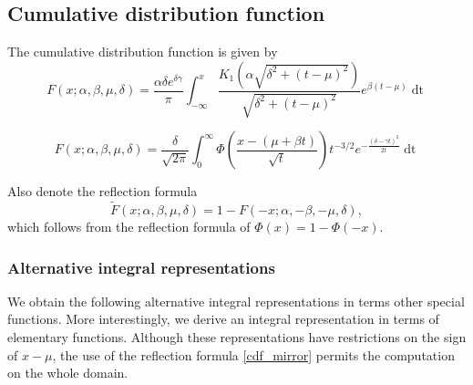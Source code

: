 \documentclass[10pt,a4paper,oneside]{article}
\numberwithin{equation}{section}
\begin{document}
\subsection{Cumulative distribution function}\label{properties_cdf}
The cumulative distribution function is given by
\begin{equation}\label{integral_k1}
F(x; \alpha, \beta, \mu, \delta) = \frac{\alpha \delta e^{\delta \gamma}}{\pi} \int_{-\infty}^{x} \frac{K_1\left(\alpha\sqrt{\delta^2 + (t-\mu)^2}\right)}{\sqrt{\delta^2 + (t-\mu)^2}} e^{\beta(t-\mu)} \mathop{dt}
\end{equation}

\begin{equation}\label{integral_phi}
F(x; \alpha, \beta, \mu, \delta) = \frac{\delta}{\sqrt{2\pi}}\int_{0}^{\infty} \Phi\left(\frac{x - (\mu +\beta t)}{\sqrt{t}}\right) t^{-3/2} e^{-\frac{(\delta - \gamma t)^2}{2t}} \mathop{dt}
\end{equation}

Also denote the reflection formula
\begin{equation}\label{cdf_mirror}
\tilde{F}(x; \alpha, \beta, \mu, \delta) = 1- F(-x; \alpha, -\beta, -\mu, \delta),
\end{equation}
which follows from the reflection formula of $\Phi(x) = 1 - \Phi(-x)$.

\subsubsection{Alternative integral representations}
We obtain the following alternative integral representations in terms other special functions. More interestingly, we derive an integral representation in terms of elementary functions. Although these representations have restrictions on the sign of $x-\mu$, the use of the reflection formula \eqref{cdf_mirror} permits the computation on the whole domain.
\end{document}
